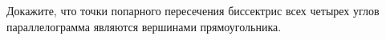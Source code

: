 \begin{ex}
	\begin{condition}
		Докажите, что точки попарного пересечения биссектрис всех четырех углов параллелограмма являются вершинами прямоугольника.
	\end{condition}
\end{ex}